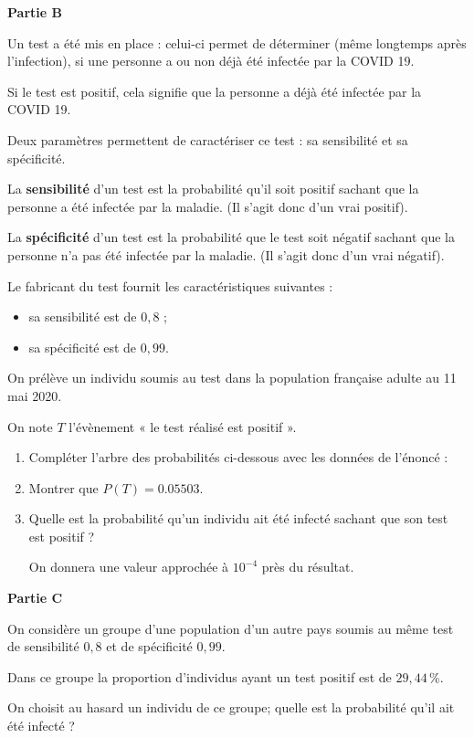 \smallskip

\textbf{Partie B}

\medskip

Un test a été mis en place : celui-ci permet de déterminer (même longtemps après l’infection), si une personne a ou non déjà été infectée par la COVID 19.

Si le test est positif, cela signifie que la personne a déjà été infectée par la COVID 19.

Deux paramètres permettent de caractériser ce test : sa sensibilité et sa spécificité.

La \textbf{sensibilité} d’un test est la probabilité qu’il soit positif sachant que la personne a été infectée par la maladie. (Il s’agit donc d’un vrai positif).

La \textbf{spécificité} d’un test est la probabilité que le test soit négatif sachant que la personne n’a pas été infectée par la maladie. (Il s’agit donc d’un vrai négatif).

\smallskip

Le fabricant du test fournit les caractéristiques suivantes :
%
\begin{itemize}
	\item sa sensibilité est de $0,8$ ;
	\item sa spécificité est de $0,99$.
\end{itemize}

On prélève un individu soumis au test dans la population française adulte au 11 mai 2020.

On note $T$ l’évènement « le test réalisé est positif ».

\begin{enumerate}
	\item Compléter l’arbre des probabilités ci-dessous avec les données de l’énoncé :
	
	\begin{Centrage}
	\end{Centrage}
	\item Montrer que $P(T) = \num{0,05503}$.
	\item Quelle est la probabilité qu’un individu ait été infecté sachant que son test est positif ?
	
	On donnera une valeur approchée à $10^{-4}$ près du résultat.
\end{enumerate}
\smallskip

\textbf{Partie C}

\medskip

On considère un groupe d’une population d’un autre pays soumis au même test de sensibilité $0,8$ et de spécificité $0,99$.

Dans ce groupe la proportion d’individus ayant un test positif est de $29,44$\,\%.

On choisit au hasard un individu de ce groupe; quelle est la probabilité qu’il ait été infecté ?